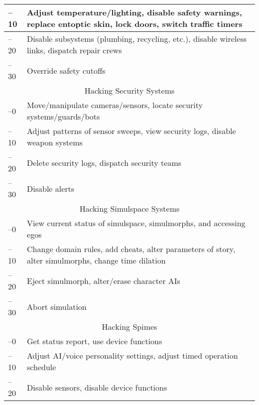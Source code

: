 \begin{table}
\begin{tabularx}{\textwidth}{|l|X|}
–10 &Adjust temperature/lighting, disable safety warnings, replace entoptic skin, lock doors, switch traffic timers \\ \hline

–20 &Disable subsystems (plumbing, recycling, etc.), disable wireless links, dispatch repair crews \\ \hline

–30 &Override safety cutoffs \\ \hline

\multicolumn{2}{|c|}{Hacking Security Systems} \\ \hline

–0 &Move/manipulate cameras/sensors, locate security systems/guards/bots \\ \hline

–10 &Adjust patterns of sensor sweeps, view security logs, disable weapon systems \\ \hline

–20 &Delete security logs, dispatch security teams \\ \hline

–30 &Disable alerts \\ \hline

\multicolumn{2}{|c|}{Hacking Simulspace Systems} \\ \hline

–0 &View current status of simulspace, simulmorphs, and accessing egos \\ \hline

–10 &Change domain rules, add cheats, alter parameters of story, alter simulmorphs, change time dilation \\ \hline

–20 &Eject simulmorph, alter/erase character AIs \\ \hline

–30 &Abort simulation \\ \hline

\multicolumn{2}{|c|}{Hacking Spimes} \\ \hline

–0 &Get status report, use device functions \\ \hline

–10 &Adjust AI/voice personality settings, adjust timed operation schedule \\ \hline

–20 &Disable sensors, disable device functions \\ \hline

\end{tabularx} \end{table} 

